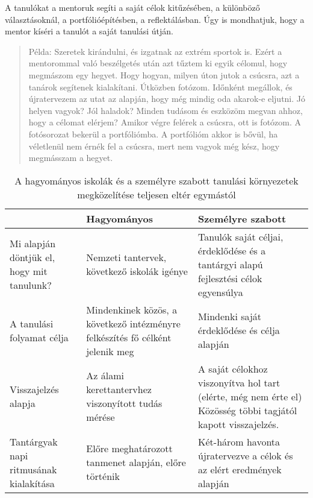 A tanulókat a mentoruk segíti a saját célok kitűzésében, a különböző választásoknál, a portfólióépítésben, a reflektálásban. Úgy is mondhatjuk, hogy a mentor kíséri a tanulót a saját tanulási útján.

\begin{quote}
Példa: Szeretek kirándulni, és izgatnak az extrém sportok is. Ezért a mentorommal való beszélgetés után azt tűztem ki egyik célomul, hogy megmászom egy hegyet. Hogy hogyan, milyen úton jutok a csúcsra, azt a tanárok segítenek kialakítani. Útközben fotózom. Időnként megállok, és újratervezem az utat az alapján, hogy még mindig oda akarok-e eljutni. Jó helyen vagyok?
Jól haladok? Minden tudásom és eszközöm megvan ahhoz, hogy a célomat elérjem?
Amikor végre felérek a csúcsra, ott is fotózom. A fotósorozat bekerül a portfóliómba.
A portfólióm akkor is bővül, ha véletlenül nem érnék fel a csúcsra, mert nem vagyok még kész, hogy megmásszam a hegyet.
\end{quote}

\begin{table}
\centering
\begin{tabular}{@{}p{2cm}|p{4cm}|p{4cm}@{}}

& \textbf{Hagyományos}  & \textbf{ Személyre szabott}
\\ \hline
  Mi alapján döntjük el, hogy mit tanulunk? &
  Nemzeti tantervek, következő iskolák igénye &
  Tanulók saját céljai, érdeklődése és a tantárgyi alapú fejlesztési célok egyensúlya \\
\hline
  A tanulási folyamat célja &
   Mindenkinek közös, a következő intézményre felkészítés fő célként jelenik meg &
   Mindenki saját érdeklődése és célja alapján \\
\hline
   Visszajelzés alapja &
   Az álami kerettantervhez viszonyított tudás mérése &
   A saját célokhoz viszonyítva hol tart (elérte, még nem érte el)
   Közösség többi tagjától kapott visszajelzés.  \\
\hline
  Tantárgyak napi ritmusának kialakítása &
   Előre meghatározott tanmenet alapján, előre történik &
   Két-három havonta újratervezve a célok és az elért eredmények alapján   \\

\end{tabular}
\caption{A hagyományos iskolák és a személyre szabott tanulási környezetek megközelítése teljesen eltér egymástól}

\label{tbl:szemelyreszabott}

\end{table}

